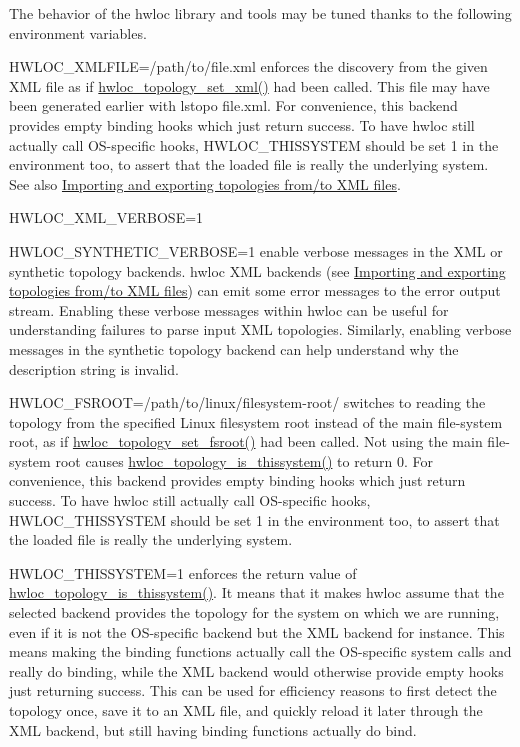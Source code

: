 The behavior of the hwloc library and tools may be tuned thanks to the following environment variables.


\begin{DoxyDescription}
\item[HWLOC\_\-XMLFILE=/path/to/file.xml ]enforces the discovery from the given XML file as if \hyperlink{a00044_ga93efcc8a962afe1ed23393700682173f}{hwloc\_\-topology\_\-set\_\-xml()} had been called. This file may have been generated earlier with lstopo file.xml. For convenience, this backend provides empty binding hooks which just return success. To have hwloc still actually call OS-\/specific hooks, HWLOC\_\-THISSYSTEM should be set 1 in the environment too, to assert that the loaded file is really the underlying system. See also \hyperlink{a00007}{Importing and exporting topologies from/to XML files}. 


\item[HWLOC\_\-XML\_\-VERBOSE=1 ]
\item[HWLOC\_\-SYNTHETIC\_\-VERBOSE=1 ]enable verbose messages in the XML or synthetic topology backends. hwloc XML backends (see \hyperlink{a00007}{Importing and exporting topologies from/to XML files}) can emit some error messages to the error output stream. Enabling these verbose messages within hwloc can be useful for understanding failures to parse input XML topologies. Similarly, enabling verbose messages in the synthetic topology backend can help understand why the description string is invalid. 


\item[HWLOC\_\-FSROOT=/path/to/linux/filesystem-\/root/ ]switches to reading the topology from the specified Linux filesystem root instead of the main file-\/system root, as if \hyperlink{a00044_ga2f6bfb6958d8b508ea1d7d5bb266432c}{hwloc\_\-topology\_\-set\_\-fsroot()} had been called. Not using the main file-\/system root causes \hyperlink{a00046_ga0d109e33fc7990f62f665d336e5e5111}{hwloc\_\-topology\_\-is\_\-thissystem()} to return 0. For convenience, this backend provides empty binding hooks which just return success. To have hwloc still actually call OS-\/specific hooks, HWLOC\_\-THISSYSTEM should be set 1 in the environment too, to assert that the loaded file is really the underlying system. 


\item[HWLOC\_\-THISSYSTEM=1 ]enforces the return value of \hyperlink{a00046_ga0d109e33fc7990f62f665d336e5e5111}{hwloc\_\-topology\_\-is\_\-thissystem()}. It means that it makes hwloc assume that the selected backend provides the topology for the system on which we are running, even if it is not the OS-\/specific backend but the XML backend for instance. This means making the binding functions actually call the OS-\/specific system calls and really do binding, while the XML backend would otherwise provide empty hooks just returning success. This can be used for efficiency reasons to first detect the topology once, save it to an XML file, and quickly reload it later through the XML backend, but still having binding functions actually do bind. 



\end{DoxyDescription}
